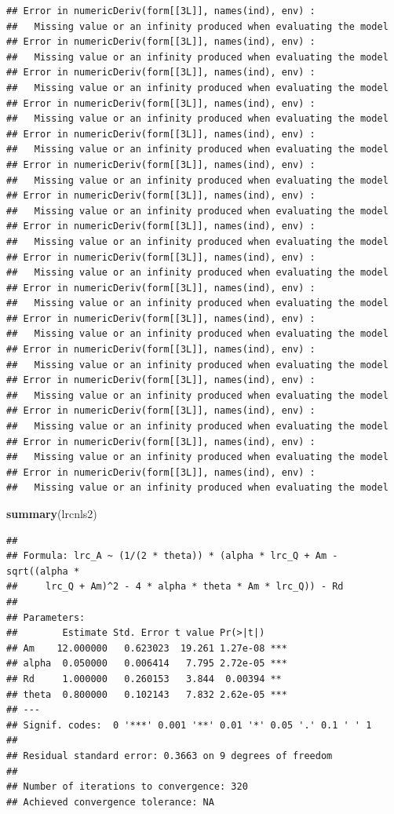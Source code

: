 \documentclass[
]{krantz}
\makeatletter
\newenvironment{Shaded}{\begin{snugshade}}{\end{snugshade}}
\newcommand{\KeywordTok}[1]{\textcolor[rgb]{0.13,0.29,0.53}{\textbf{#1}}}
\newcommand{\NormalTok}[1]{#1}
\newenvironment{kframe}{%
\medskip{}
\setlength{\fboxsep}{.8em}
 \def\at@end@of@kframe{}%
 \ifinner\ifhmode%
  \def\at@end@of@kframe{\end{minipage}}%
  \begin{minipage}{\columnwidth}%
 \fi\fi%
 \def\FrameCommand##1{\hskip\@totalleftmargin \hskip-\fboxsep
 \colorbox{shadecolor}{##1}\hskip-\fboxsep
     \hskip-\linewidth \hskip-\@totalleftmargin \hskip\columnwidth}%
 \MakeFramed {\advance\hsize-\width
   \@totalleftmargin\z@ \linewidth\hsize
   \@setminipage}}%
 {\par\unskip\endMakeFramed%
 \at@end@of@kframe}
\renewenvironment{Shaded}{\begin{kframe}}{\end{kframe}}
\makeatother
\begin{document}
\begin{verbatim}
## Error in numericDeriv(form[[3L]], names(ind), env) : 
##   Missing value or an infinity produced when evaluating the model
## Error in numericDeriv(form[[3L]], names(ind), env) : 
##   Missing value or an infinity produced when evaluating the model
## Error in numericDeriv(form[[3L]], names(ind), env) : 
##   Missing value or an infinity produced when evaluating the model
## Error in numericDeriv(form[[3L]], names(ind), env) : 
##   Missing value or an infinity produced when evaluating the model
## Error in numericDeriv(form[[3L]], names(ind), env) : 
##   Missing value or an infinity produced when evaluating the model
## Error in numericDeriv(form[[3L]], names(ind), env) : 
##   Missing value or an infinity produced when evaluating the model
## Error in numericDeriv(form[[3L]], names(ind), env) : 
##   Missing value or an infinity produced when evaluating the model
## Error in numericDeriv(form[[3L]], names(ind), env) : 
##   Missing value or an infinity produced when evaluating the model
## Error in numericDeriv(form[[3L]], names(ind), env) : 
##   Missing value or an infinity produced when evaluating the model
## Error in numericDeriv(form[[3L]], names(ind), env) : 
##   Missing value or an infinity produced when evaluating the model
## Error in numericDeriv(form[[3L]], names(ind), env) : 
##   Missing value or an infinity produced when evaluating the model
## Error in numericDeriv(form[[3L]], names(ind), env) : 
##   Missing value or an infinity produced when evaluating the model
## Error in numericDeriv(form[[3L]], names(ind), env) : 
##   Missing value or an infinity produced when evaluating the model
## Error in numericDeriv(form[[3L]], names(ind), env) : 
##   Missing value or an infinity produced when evaluating the model
## Error in numericDeriv(form[[3L]], names(ind), env) : 
##   Missing value or an infinity produced when evaluating the model
## Error in numericDeriv(form[[3L]], names(ind), env) : 
##   Missing value or an infinity produced when evaluating the model
\end{verbatim}

\begin{Shaded}
\begin{Highlighting}[]
\KeywordTok{summary}\NormalTok{(lrcnls2)}
\end{Highlighting}
\end{Shaded}

\begin{verbatim}
## 
## Formula: lrc_A ~ (1/(2 * theta)) * (alpha * lrc_Q + Am - sqrt((alpha * 
##     lrc_Q + Am)^2 - 4 * alpha * theta * Am * lrc_Q)) - Rd
## 
## Parameters:
##        Estimate Std. Error t value Pr(>|t|)    
## Am    12.000000   0.623023  19.261 1.27e-08 ***
## alpha  0.050000   0.006414   7.795 2.72e-05 ***
## Rd     1.000000   0.260153   3.844  0.00394 ** 
## theta  0.800000   0.102143   7.832 2.62e-05 ***
## ---
## Signif. codes:  0 '***' 0.001 '**' 0.01 '*' 0.05 '.' 0.1 ' ' 1
## 
## Residual standard error: 0.3663 on 9 degrees of freedom
## 
## Number of iterations to convergence: 320 
## Achieved convergence tolerance: NA
\end{verbatim}
\end{document}
